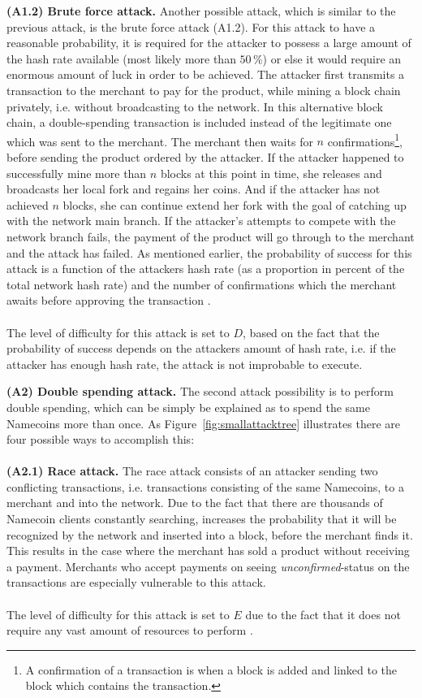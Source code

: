 \documentclass[frame, english]{idamasterthesis}
\begin{document}
\textbf{(A1.2) Brute force attack.} Another possible attack, which is similar to the previous attack, is the brute force attack (A1.2). For this attack to have a reasonable probability, it is required for the attacker to possess a large amount of the hash rate available (most likely more than $50 \, \%$) or else it would require an enormous amount of luck in order to be achieved. The attacker first transmits a transaction to the merchant to pay for the product, while mining a block chain privately, i.e. without broadcasting to the network. In this alternative block chain, a double-spending transaction is included instead of the legitimate one which was sent to the merchant. The merchant then waits for $n$ confirmations\footnote{A confirmation of a transaction is when a block is added and linked to the block which contains the transaction.}, before sending the product ordered by the attacker. If the attacker happened to successfully mine more than $n$ blocks at this point in time, she releases and broadcasts her local fork and regains her coins. And if the attacker has not achieved $n$ blocks, she can continue extend her fork with the goal of catching up with the network main branch. If the attacker's attempts to compete with the network branch fails, the payment of the product will go through to the merchant and the attack has failed. As mentioned earlier, the probability of success for this attack is a function of the attackers hash rate (as a proportion in percent of the total network hash rate) and the number of confirmations which the merchant awaits before approving the transaction \cite{hashratespending}. \\\\
The level of difficulty for this attack is set to $D$, based on the fact that the probability of success depends on the attackers amount of hash rate, i.e. if the attacker has enough hash rate, the attack is not improbable to execute.

\pagebreak

\noindent
\textbf{(A2) Double spending attack.}
The second attack possibility is to perform double spending, which can be simply be explained as to spend the same Namecoins more than once. As Figure~\ref{fig:smallattacktree} illustrates there are four possible ways to accomplish this:\\\\
\noindent
\textbf{(A2.1) Race attack.} The race attack consists of an attacker sending two conflicting transactions, i.e. transactions consisting of the same Namecoins, to a merchant and into the network. Due to the fact that there are thousands of Namecoin clients constantly searching, increases the probability that it will be recognized by the network and inserted into a block, before the merchant finds it. This results in the case where the merchant has sold a product without receiving a payment. Merchants who accept payments on seeing \emph{unconfirmed}-status on the transactions are especially vulnerable to this attack. \\\\ The level of difficulty for this attack is set to $E$ due to the fact that it does not require any vast amount of resources to perform \cite{bitcoin-attacks}. \\
\end{document}
